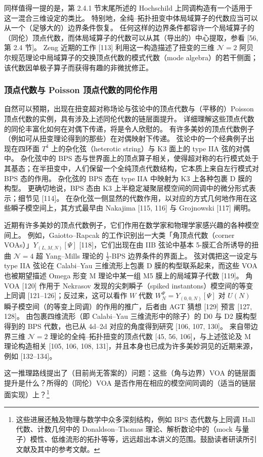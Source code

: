 同样值得一提的是，第 2.4.1 节末尾所述的 Hochschild 上同调构造有一个适用于这一混合三维设定的类比。
特别地，全纯–拓扑扭变中体局域算子的代数应当可以从一个（足够大的）边界条件恢复。
任何这样的边界条件都容许一个局域算子的（同伦）顶点代数，而体局域算子的代数可以从其（导出的）中心提取，参看 [56, 第 2.4 节]。
Zeng 近期的工作 [113] 利用这一构造描述了扭变的三维 $\mathcal{N}=2$ 阿贝尔规范理论中局域算子的交换顶点代数的模式代数（mode algebra）的若干侧面；该代数因单极子算子而获得有趣的非微扰修正。

\subsubsection{顶点代数与 Poisson 顶点代数的同伦作用}

自然可以预期，出现在扭变超对称场论与弦论中的顶点代数与（平移的）Poisson 顶点代数的实例，具有涉及上述同伦代数的链层面提升。
详细理解这些顶点代数的同伦丰富化如何在对偶下传递，将是令人欣慰的。
有许多美妙的顶点代数例子（例如可从扭变理论得到的那些）在对偶映射下传递。
弦论中的一个经典例子出现在四环面 $T^4$ 上的杂化弦（heterotic string）与 K3 面上的 type IIA 弦的对偶中。
杂化弦中的 BPS 态与世界面上的顶点算子相关，使得超对称的右行模式处于其基态；在半扭变中，人们保留一个全纯顶点代数结构，它本质上来自左行模式对 BPS 态的作用。
杂化弦的 BPS 态在 type IIA 中映射为 K3 上各种包裹 D 膜的构型。
更确切地说，BPS 态由 K3 上半稳定凝聚层模空间的同调中的微分形式表示；细节见 [114]。
在杂化弦一侧显然的代数作用，以对应的方式几何地作用在这些瞬子模空间上，其方式最早由 Nakajima [115, 116] 与 Grojnowski [117] 阐明。

近期有许多美妙的顶点代数例子，它们作用在数学家和物理学家感兴趣的各种模空间上。
例如，Gaiotto--Rapcak 的工作识别出一大类「角顶点代数（corner VOAs）」$Y_{(L,M,N)}[\Psi]$ [118]，它们出现在由 IIB 弦论中基本 5-膜汇合所诱导的扭曲 $\mathcal{N}=4$ 超 Yang--Mills 理论的 $\frac{1}{2}$-BPS 边界条件的界面上。
弦对偶把这一设定与 type IIA 弦论在 Calabi--Yau 三维流形上包裹 D 膜的构型联系起来，而这些 VOA 也被期望描述 Omega 形变 M 理论中某一组 M5 膜上的局域算子代数 [119]。
角 VOA [120] 作用于 Nekrasov 发现的尖刺瞬子（spiked instantons）模空间的等变上同调 [121--126]；反过来，这可以看作 $W$ 代数 $W^\Psi_N=Y_{(0,0,N)}[\Psi]$ 对 $U(N)$ 瞬子模空间（的等变上同调）的作用的推广，后者由 AGT 猜想 [129] 预言 [127, 128]。
由包裹四维流形（即 Calabi--Yau 三维流形中的除子）的 D0 与 D2 膜构型得到的 BPS 代数，也已从 4d--2d 对应的角度得到研究 [106, 107, 130]。
来自带边界三维 $\mathcal{N}=2$ 理论的全纯–拓扑扭变的顶点代数 [45, 56, 106]，与上述弦论及 M 理论构造相关 [105, 106, 108, 131]，并且本身也已成为许多美妙洞见的近期来源，例如 [132--134]。

这一推理路线提出了（目前尚无答案的）问题：这些（角与边界）VOA 的链层面提升是什么？所得的（同伦）VOA 是否作用在相应的模空间同调的（适当的链层面实现）上？\footnote{这些进展还触及物理与数学中众多深刻结构，例如 BPS 态代数与上同调 Hall 代数、计数几何中的 Donaldson--Thomas 理论、解析数论中的（mock 与量子）模性、低维流形的拓扑等等，远远超出本讲义的范围。鼓励读者研读所引文献及其中的参考文献。}
